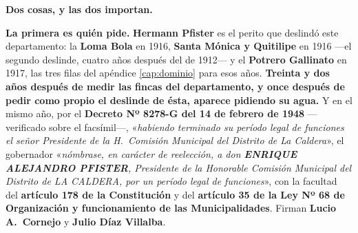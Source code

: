 \begin{cautela}
\textbf{Dos cosas, y las dos importan.}

\textbf{La primera es quién pide.} \textbf{Hermann Pfister} es el perito que deslindó este
departamento: la \textbf{Loma Bola} en 1916, \textbf{Santa Mónica y Quitilipe} en 1916 ---el
segundo deslinde, cuatro años después del de 1912--- y el \textbf{Potrero Gallinato} en 1917,
las tres filas del apéndice \ref{cap:dominio} para esos años. \textbf{Treinta y dos años
después de medir las fincas del departamento, y once después de pedir como propio el deslinde de ésta, aparece pidiendo su agua.}
Y en el mismo año, por el \textbf{Decreto Nº 8278-G del 14 de febrero de 1948} ---verificado
sobre el facsímil---, «\textit{habiendo terminado su período legal de funciones el señor
Presidente de la H.\ Comisión Municipal del Distrito de La Caldera}», el gobernador
«\textit{nómbrase, en carácter de reelección, a don \textbf{ENRIQUE ALEJANDRO PFISTER},
Presidente de la Honorable Comisión Municipal del Distrito de LA CALDERA, por un período
legal de funciones}», con la facultad del \textbf{artículo 178 de la Constitución} y del
\textbf{artículo 35 de la Ley Nº 68 de Organización y funcionamiento de las
Municipalidades}. Firman \textbf{Lucio A.\ Cornejo} y \textbf{Julio Díaz Villalba}.


\end{cautela}
